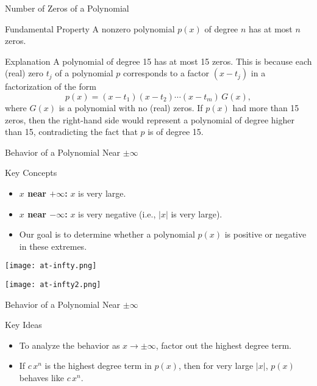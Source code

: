 \begin{frame}{Number of Zeros of a Polynomial}
  \begin{block}{Fundamental Property}
    A nonzero polynomial \(p(x)\) of degree \(n\) has at most \(n\) zeros.
  \end{block}

  \begin{block}{Explanation}
    A polynomial of degree 15 has at most 15 zeros. This is because each (real) zero \(t_j\) of a polynomial \(p\) corresponds to a factor \((x-t_j)\) in a factorization of the form
    \[
      p(x) = (x-t_1)(x-t_2)\cdots(x-t_m) \, G(x),
    \]
    where \(G(x)\) is a polynomial with no (real) zeros. If \(p(x)\) had more than 15 zeros, then the right-hand side would represent a polynomial of degree higher than 15, contradicting the fact that \(p\) is of degree 15.
  \end{block}
\end{frame}


\begin{frame}{Behavior of a Polynomial Near \(\pm\infty\)}
  \begin{block}{Key Concepts}
    \begin{itemize}
      \item \textbf{\(x\) near \(+\infty\):} \(x\) is very large.
      \item \textbf{\(x\) near \(-\infty\):} \(x\) is very negative (i.e., \(|x|\) is very large).
      \item Our goal is to determine whether a polynomial \(p(x)\) is positive or negative in these extremes.
    \end{itemize}
  \end{block}
\end{frame}

\begin{frame}
  \centering
  \texttt{[image: at-infty.png]}

  \centering
  \texttt{[image: at-infty2.png]}

\end{frame}
 

\begin{frame}{Behavior of a Polynomial Near \(\pm\infty\)}
  \begin{block}{Key Ideas}
    \begin{itemize}
      \item To analyze the behavior as \(x\to\pm\infty\), factor out the highest degree term.
      \item If \(c\,x^n\) is the highest degree term in \(p(x)\), then for very large \(|x|\), \(p(x)\) behaves like \(c\,x^n\).
    \end{itemize}
  \end{block}
\end{frame}
   

